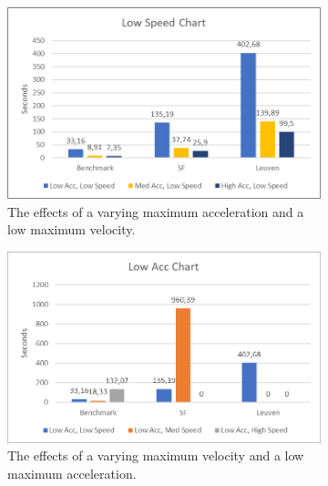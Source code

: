 \begin{figure}
	\centering
	
	\begin{subfigure}[t]{.9\textwidth}
        		\includegraphics[width=\textwidth]{img/agility-low-speed}
        		\caption{The effects of a varying maximum acceleration and a low maximum velocity.}
        		\label{fig:agility-low-speed}
	\end{subfigure}
		
	\begin{subfigure}[t]{.9\textwidth}
        		\includegraphics[width=\textwidth]{img/agility-low-acc}
        		\caption{The effects of a varying maximum velocity and a low maximum acceleration.}
        		\label{fig:agility-low-acc}
	\end{subfigure}	
	
        
    \caption{}\label{fig:agility-low}
\end{figure}

